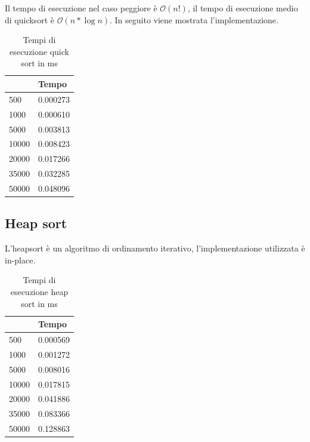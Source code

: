 \documentclass[12pt, a4paper]{report}
\begin{document}
Il tempo di esecuzione nel caso peggiore è $\mathcal{O}(n!) $, il tempo di esecuzione medio di quicksort è $\mathcal{O}(n * \log{}n) $. In seguito viene mostrata l'implementazione.

	

\begin{table}[ht]
\centering
\begin{tabular}{| l | l |}
\hline
 & Tempo \\ \hline
500 & 0.000273 \\ \hline
1000 & 0.000610 \\ \hline
5000 & 0.003813 \\ \hline
10000 & 0.008423 \\ \hline
20000 & 0.017266 \\ \hline
35000 & 0.032285 \\ \hline
50000 & 0.048096 \\ \hline

\end{tabular}
\caption{Tempi di esecuzione quick sort in ms}
\label{Tab:Tempi esecuzione QuickSort}
\end{table}

\subsection{Heap sort}
L'heapsort è un algoritmo di ordinamento iterativo, l'implementazione utilizzata è in-place.

	

\begin{table}[ht]
\centering
\begin{tabular}{| l | l |}
\hline
 & Tempo \\ \hline
500 & 0.000569 \\ \hline
1000 & 0.001272 \\ \hline
5000 & 0.008016 \\ \hline
10000 & 0.017815 \\ \hline
20000 & 0.041886 \\ \hline
35000 & 0.083366 \\ \hline
50000 & 0.128863 \\ \hline

\end{tabular}
\caption{Tempi di esecuzione heap sort in ms}
\label{Tab:Tempi esecuzione HeapSort}
\end{table}
\end{document}
